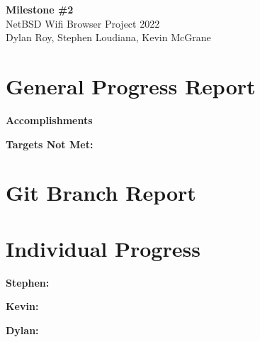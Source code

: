 \documentclass[11pt]{article}
\begin{document}
\begin{center}
  \textbf{\Large Milestone \#2}\\\large NetBSD Wifi Browser Project 2022\\
  Dylan Roy, Stephen Loudiana, Kevin McGrane
\end{center}

\section{General Progress Report}

\textbf{Accomplishments}
\begin{itemize}
\end{itemize}

\textbf{Targets Not Met:}
\begin{itemize}
\end{itemize}


\section{Git Branch Report}


\section{Individual Progress}

\textbf{Stephen:}
\begin{itemize}

\end{itemize}


\textbf{Kevin:}
\begin{itemize}

\end{itemize}


\textbf{Dylan:}
\begin{itemize}

\end{itemize}
\end{document}
